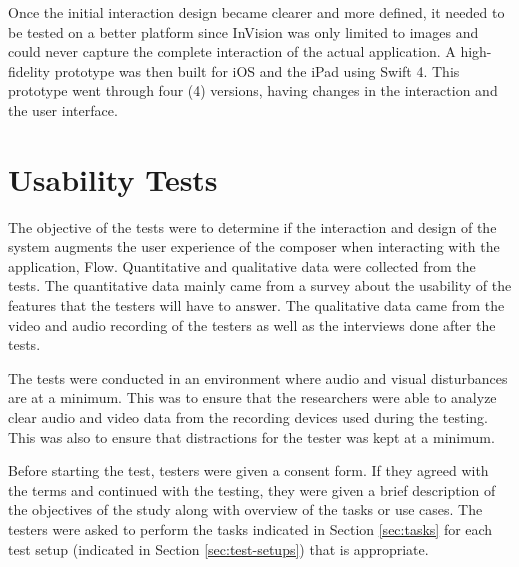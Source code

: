 		Once the initial interaction design became clearer and more defined, it needed to be tested on a better platform since InVision was only limited to images and could never capture the complete interaction of the actual application. A high-fidelity prototype was then built for iOS and the iPad using Swift 4. This prototype went through four (4) versions, having changes in the interaction and the user interface. 

	\section{Usability Tests}

		The objective of the tests were to determine if the interaction and design of the system augments the user experience of the composer when interacting with the application, Flow.  Quantitative and qualitative data were collected from the tests. The quantitative data mainly came from a survey about the usability of the features that the testers will have to answer. The qualitative data came from the video and audio recording of the testers as well as the interviews done after the tests. %

		The tests were conducted in an environment where audio and visual disturbances are at a minimum. This was to ensure that the researchers were able to analyze clear audio and video data from the recording devices used during the testing. This was also to ensure that distractions for the tester was kept at a minimum.


		Before starting the test, testers were given a consent form. If they agreed with the terms and continued with the testing, they were given a brief description of the objectives of the study along with overview of the tasks or use cases. The testers were asked to perform the tasks indicated in Section \ref{sec:tasks} for each test setup (indicated in Section \ref{sec:test-setups}) that is appropriate. 
		
